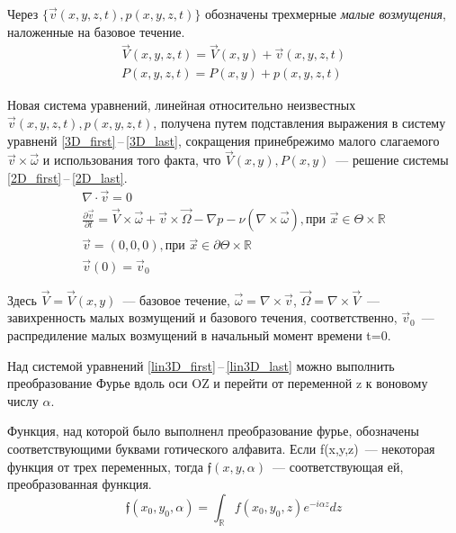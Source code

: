 Через $\{ \vec v(x,y,z,t), p(x,y,z,t) \} $ обозначены трехмерные \textit{малые возмущения}, наложенные на базовое течение. 
\begin{gather*}
  \vec V(x,y,z,t) = \vec V(x,y) + \vec v(x,y,z,t) \\
  P(x,y,z,t) = P(x,y) + p(x,y,z,t)
\end{gather*}

Новая система уравнений, линейная относительно неизвестных $ \vec v(x,y,z,t), p(x,y,z,t) $, получена путем подставления выражения в систему уравненй \ref{3D_first}\,--\,\ref{3D_last}, сокращения принебрежимо малого слагаемого $ \vec v \times \vec \omega $ и использования того факта, что  $\vec V(x,y), P(x,y) $~--- решение системы \ref{2D_first}\,--\,\ref{2D_last}.
\begin{gather} 
  \label{lin3D_first}
  \nabla \cdot \vec v = 0\\
  \frac{\partial \vec v}{\partial t} = \vec V \times \vec \omega + \vec v \times \vec \Omega - \nabla p - \nu ( \nabla \times \vec \omega ), \text{при } \vec x \in \Theta \times \mathbb{R}\\
  \vec v = (0,0,0), \text{при } \vec x \in \partial \Theta \times \mathbb{R} \\
  \vec v (0) = \vec v _0 \label{lin3D_last}
\end{gather}

Здесь $\vec V = \vec V(x,y) $~--- базовое течение, $ \vec \omega = \nabla \times \vec v $, $ \vec \Omega = \nabla \times \vec V $~--- завихренность малых возмущений и базового течения, соответственно, $\vec v _0$~--- распредиление малых возмущений в начальный момент времени t=0. 

Над системой уравнений \ref{lin3D_first}\,--\,\ref{lin3D_last} можно выполнить преобразование Фурье вдоль оси OZ и перейти от переменной z к воновому числу $\alpha$.

Функция, над которой было выполненл преобразование фурье, обозначены соответствующими буквами готического алфавита. Если f(x,y,z)~--- некоторая функция от трех переменных, тогда $ \mathfrak{f}(x,y,\alpha) $~--- соответствующая ей, преобразованная функция.
$$
 \mathfrak{f}(x_0,y_0,\alpha) = \int_\mathbb{R} f(x_0,y_0,z) e^{-i\alpha z} dz 
$$

